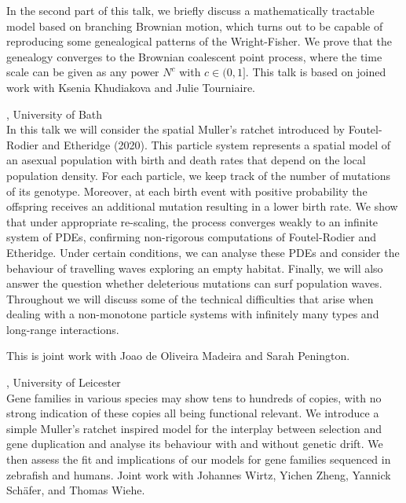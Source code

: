 \documentclass[12pt,a4paper]{article}
\begin{document}
 In the second part of this talk, we briefly discuss a mathematically tractable model based on branching Brownian motion, which turns out to be capable of reproducing some genealogical patterns of the Wright-Fisher. We prove that the genealogy converges to the Brownian coalescent point process, where the time scale can be given as any power $N^c$ with $c \in (0,1]$. This talk is based on joined work with Ksenia Khudiakova and Julie Tourniaire. 

\bigskip\bigskip

, University of Bath \\[2ex] In this talk we will consider the spatial Muller's ratchet introduced by Foutel-Rodier and Etheridge (2020). This particle system represents a spatial model of an asexual population with birth and death rates that depend on the local population density. For each particle, we keep track of the number of mutations of its genotype. Moreover, at each birth event with positive probability the offspring receives an additional mutation resulting in a lower birth rate. We show that under appropriate re-scaling, the process converges weakly to an infinite system of PDEs, confirming non-rigorous computations of Foutel-Rodier and Etheridge. Under certain conditions, we can analyse these PDEs and consider the behaviour of travelling waves exploring an empty habitat. Finally, we will also answer the question whether deleterious mutations can surf population waves. Throughout we will discuss some of the technical difficulties that arise when dealing with a non-monotone particle systems with infinitely many types and long-range interactions. 

 This is joint work with Joao de Oliveira Madeira and Sarah Penington. 

\bigskip\bigskip

, University of Leicester \\[2ex] Gene families in various species may show tens to hundreds of copies, with no strong indication of these copies all being functional relevant. We introduce a simple Muller's ratchet inspired model for the interplay between selection and gene duplication and analyse its behaviour with and without genetic drift. We then assess the fit and implications of our models for gene families sequenced in zebrafish and humans. Joint work with Johannes Wirtz, Yichen Zheng, Yannick Schäfer, and Thomas Wiehe. 
\end{document}

